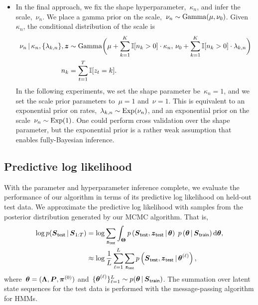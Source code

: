 \begin{itemize}
\item In the final approach, we fix the shape
  hyperparameter,~$\kappa_n$, and infer the scale,~$\nu_n$.  We
  place a gamma prior on the scale,~$\nu_n \sim \mathrm{Gamma}(\mu,
  \nu_0)$. Given~$\kappa_n$, the conditional distribution of the scale
  is
\begin{align*}
  \nu_n \,|\, \kappa_n, \{\lambda_{k,n}\}, \boldsymbol{z}  
  &\sim \mathrm{Gamma}\bigg(
    \mu + \sum_{k=1}^K \mathbb{I}[n_k > 0] \cdot \kappa_n, \,
    \nu_0 + \sum_{k=1}^K \mathbb{I}[n_k > 0] \cdot \lambda_{k,n} \bigg) \\
  n_k &= \sum_{t=1}^T \mathbb{I}[z_t=k].
\end{align*}
In the following experiments, we set the shape parameter
be~$\kappa_n=1$, and we set the scale prior parameters to~$\mu=1$
and~$\nu=1$.  This is equivalent to an exponential prior on
rates,~$\lambda_{k,n} \sim \mathrm{Exp}(\nu_n)$, and an
exponential prior on the scale~$\nu_n \sim \mathrm{Exp}(1)$.
One could perform cross validation over the shape parameter, but the
exponential prior is a rather weak assumption that enables
fully-Bayesian inference.


\end{itemize}


\subsection{Predictive log likelihood}
With the parameter and hyperparameter inference complete, we evaluate
the performance of our algorithm in terms of its predictive log
likelihood on held-out test data. We approximate the predictive log
likelihood with samples from the posterior distribution generated by
our MCMC algorithm. That is,
\begin{align*}
\log p(\boldsymbol{S}_{\mathsf{test}} \,|\, \boldsymbol{S}_{1:T}) &= \log \sum_{\boldsymbol{z}_{\mathsf{test}}} \int_{\boldsymbol{\Theta}} p\left(\boldsymbol{S}_{\mathsf{test}}, \boldsymbol{z}_{\mathsf{test}} \,|\, \boldsymbol{\theta} \right) \; p\left(\boldsymbol{\theta} \,|\, \boldsymbol{S}_{\mathsf{train}} \right) \mathrm{d}\boldsymbol{\theta}, \\
&\approx \log \frac{1}{L} \sum_{\ell=1}^L \sum_{\boldsymbol{z}_{\mathsf{test}}} p\left(\boldsymbol{S}_{\mathsf{test}},  \boldsymbol{z}_{\mathsf{test}} \,|\, \boldsymbol{\theta}^{(\ell)} \right),
\end{align*}
where~${\boldsymbol{\theta}=(\boldsymbol{\Lambda}, \boldsymbol{P}, \boldsymbol{\pi}^{(0)})}$ and~$\{\boldsymbol{\theta}^{(\ell)} \}_{\ell=1}^L
\sim p(\boldsymbol{\theta} \,|\, \boldsymbol{S}_{\mathsf{train}})$. The summation over latent state
sequences for the test data is performed with the message-passing
algorithm for HMMs.

